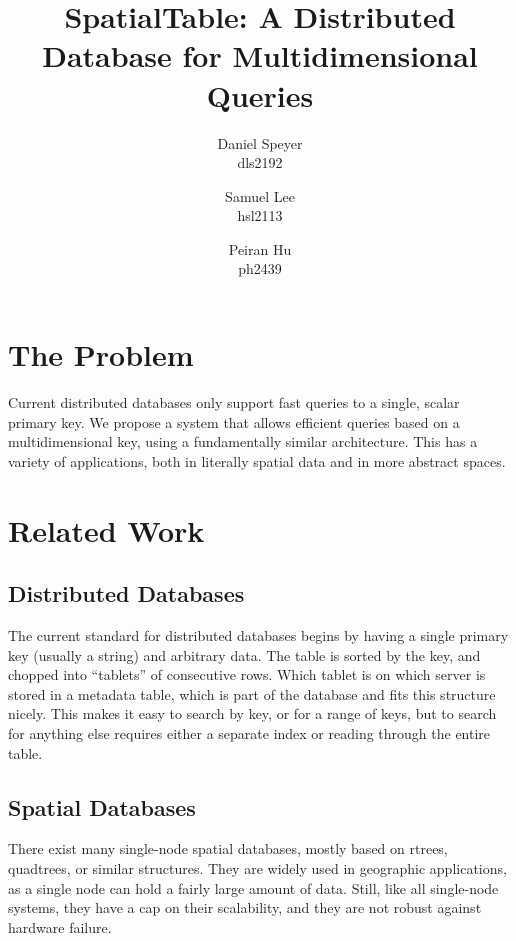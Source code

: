 \documentclass[11pt]{article}
\begin{document}
\author{Daniel Speyer\\dls2192 \and Samuel Lee\\hsl2113 \and Peiran Hu\\ph2439}
\title{SpatialTable: A Distributed Database for Multidimensional Queries}



\maketitle

\section{The Problem}
Current distributed databases only support fast queries to a single, scalar primary key. We propose a system that allows efficient queries based on a multidimensional key, using a fundamentally similar architecture. This has a variety of applications, both in literally spatial data and in more abstract spaces.
\section{Related Work}

\subsection{Distributed Databases}

The current standard for distributed databases begins by having a single primary key (usually a string) and arbitrary data. The table is sorted by the key, and chopped into ``tablets'' of consecutive rows. Which tablet is on which server is stored in a metadata table, which is part of the database and fits this structure nicely. This makes it easy to search by key, or for a range of keys, but to search for anything else requires either a separate index or reading through the entire table.

\subsection{Spatial Databases}

There exist many single-node spatial databases, mostly based on rtrees, quadtrees, or similar structures. They are widely used in geographic applications, as a single node can hold a fairly large amount of data. Still, like all single-node systems, they have a cap on their scalability, and they are not robust against hardware failure.
\end{document}
